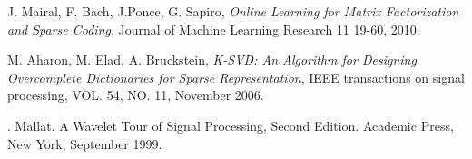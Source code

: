 \documentclass[a4paper,11pt]{article}
\begin{document}
\begin{thebibliography}{9}
  J. Mairal, F. Bach, J.Ponce, G. Sapiro,
  \emph{Online Learning for Matrix Factorization and Sparse Coding},
  Journal of Machine Learning Research 11 19-60, 2010.

  M. Aharon, M. Elad, A. Bruckstein,
  \emph{K-SVD: An Algorithm for Designing Overcomplete Dictionaries for Sparse Representation},
  IEEE transactions on signal processing, VOL. 54, NO. 11, November 2006.

. Mallat. A Wavelet Tour of Signal Processing, Second Edition. Academic Press, New York,
September 1999.
\end{thebibliography}
\end{document}
